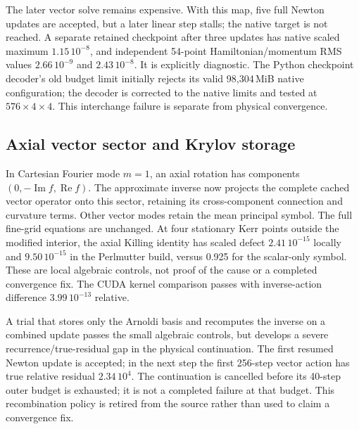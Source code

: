 \documentclass[aps,prd,preprint,notitlepage,nofootinbib]{revtex4-2}
\begin{document}
The later vector solve remains expensive. With this map, five full Newton
updates are accepted, but a later linear step stalls; the native target
is not reached. A separate retained checkpoint after three updates has
native scaled maximum $1.15\,10^{-8}$, and independent 54-point
Hamiltonian/momentum RMS values $2.66\,10^{-9}$ and $2.43\,10^{-8}$.
It is explicitly diagnostic. The Python checkpoint decoder's old budget
limit initially rejects its valid 98,304\,MiB native configuration; the
decoder is corrected to the native limits and tested at $576\times4\times4$.
This interchange failure is separate from physical convergence.

\subsection{Axial vector sector and Krylov storage}
In Cartesian Fourier mode $m=1$, an axial rotation has components
$(0,-\operatorname{Im}f,\operatorname{Re}f)$. The approximate inverse now
projects the complete cached vector operator onto this sector, retaining
its cross-component connection and curvature terms. Other vector modes
retain the mean principal symbol. The full fine-grid equations are
unchanged. At four stationary Kerr points outside the modified interior,
the axial Killing identity has scaled defect $2.41\,10^{-15}$ locally
and $9.50\,10^{-15}$ in the Perlmutter build, versus 0.925 for the
scalar-only symbol. These are local algebraic controls, not proof of the
cause or a completed convergence fix. The CUDA kernel comparison passes
with inverse-action difference $3.99\,10^{-13}$ relative.

A trial that stores only the Arnoldi basis and recomputes the inverse
on a combined update passes the small algebraic controls, but develops
a severe recurrence/true-residual gap in the physical continuation.
The first resumed Newton update is accepted; in the next step the first
256-step vector action has true relative residual $2.34\,10^4$.
The continuation is cancelled before its 40-step outer budget is exhausted;
it is not a completed failure at that budget. This recombination policy
is retired from the source rather than used to claim a convergence fix.
\end{document}
